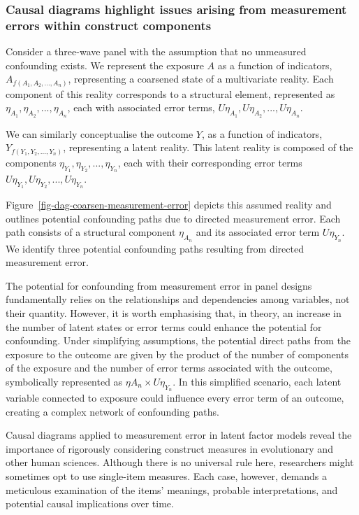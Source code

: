 \documentclass[
  singlecolumn]{article}
\begin{document}
\hypertarget{causal-diagrams-highlight-issues-arising-from-measurement-errors-within-construct-components}{%
\subsubsection{Causal diagrams highlight issues arising from measurement
errors within construct
components}\label{causal-diagrams-highlight-issues-arising-from-measurement-errors-within-construct-components}}

Consider a three-wave panel with the assumption that no unmeasured
confounding exists. We represent the exposure \(A\) as a function of
indicators, \(A_{f(A_1, A_2, ..., A_n)}\), representing a coarsened
state of a multivariate reality. Each component of this reality
corresponds to a structural element, represented as
\(\eta_{A_1}, \eta_{A_2}, ..., \eta_{A_n}\), each with associated error
terms, \(U\eta_{A_1}, U\eta_{A_2}, ..., U\eta_{A_n}\).

We can similarly conceptualise the outcome \(Y\), as a function of
indicators, \(Y_{f(Y_1, Y_2, ..., Y_n)}\), representing a latent
reality. This latent reality is composed of the components
\(\eta_{Y_1}, \eta_{Y_2}, ..., \eta_{Y_n}\), each with their
corresponding error terms
\(U\eta_{Y_1}, U\eta_{Y_2}, ..., U\eta_{Y_n}\).

Figure~\ref{fig-dag-coarsen-measurement-error} depicts this assumed
reality and outlines potential confounding paths due to directed
measurement error. Each path consists of a structural component
\(\eta_{A_n}\) and its associated error term \(U\eta_{Y_n}\). We
identify three potential confounding paths resulting from directed
measurement error.

The potential for confounding from measurement error in panel designs
fundamentally relies on the relationships and dependencies among
variables, not their quantity. However, it is worth emphasising that, in
theory, an increase in the number of latent states or error terms could
enhance the potential for confounding. Under simplifying assumptions,
the potential direct paths from the exposure to the outcome are given by
the product of the number of components of the exposure and the number
of error terms associated with the outcome, symbolically represented as
\(\eta A_n \times U\eta_{Y_n}\). In this simplified scenario, each
latent variable connected to exposure could influence every error term
of an outcome, creating a complex network of confounding paths.

Causal diagrams applied to measurement error in latent factor models
reveal the importance of rigorously considering construct measures in
evolutionary and other human sciences. Although there is no universal
rule here, researchers might sometimes opt to use single-item measures.
Each case, however, demands a meticulous examination of the items'
meanings, probable interpretations, and potential causal implications
over time.
\end{document}
